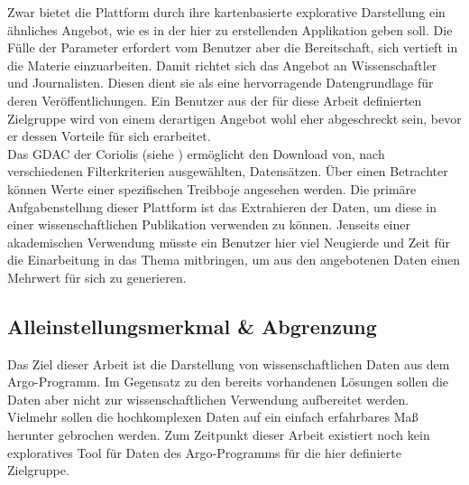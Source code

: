 Zwar bietet die Plattform durch ihre kartenbasierte explorative Darstellung ein ähnliches Angebot, wie es in der hier zu erstellenden Applikation geben soll. Die Fülle der Parameter erfordert vom Benutzer aber die Bereitschaft, sich vertieft in die Materie einzuarbeiten. Damit richtet sich das Angebot an Wissenschaftler und Journalisten. Diesen dient sie als eine hervorragende Datengrundlage für deren Veröffentlichungen. Ein Benutzer aus der für diese Arbeit definierten Zielgruppe wird von einem derartigen Angebot wohl eher abgeschreckt sein, bevor er dessen Vorteile für sich erarbeitet.
\\

Das \gls{GDAC} der Coriolis (siehe \cite{ArgoDataSelection}) ermöglicht den Download von, nach verschiedenen Filterkriterien ausgewählten, Datensätzen. Über einen Betrachter können Werte einer spezifischen Treibboje angesehen werden.
Die primäre Aufgabenstellung dieser Plattform ist das Extrahieren der Daten, um diese in einer wissenschaftlichen Publikation verwenden zu können. Jenseits einer akademischen Verwendung müsste ein Benutzer hier viel Neugierde und Zeit für die Einarbeitung in das Thema mitbringen, um aus den angebotenen Daten einen Mehrwert für sich zu generieren.


\subsection{Alleinstellungsmerkmal \& Abgrenzung}

Das Ziel dieser Arbeit ist die Darstellung von wissenschaftlichen Daten aus dem Argo-Programm. Im Gegensatz zu den bereits vorhandenen Lösungen sollen die Daten aber nicht zur wissenschaftlichen Verwendung aufbereitet werden. Vielmehr sollen die hochkomplexen Daten auf ein einfach erfahrbares Maß herunter gebrochen werden. Zum Zeitpunkt dieser Arbeit existiert noch kein exploratives Tool für Daten des Argo-Programms für die hier definierte Zielgruppe.
